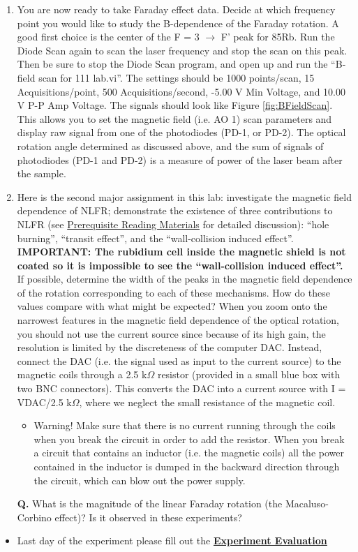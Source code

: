 \documentclass{../lab}
\begin{document}
\begin{enumerate}
\newpage
    
    \item You are now ready to take Faraday effect data. Decide at which frequency point you would like to study the B-dependence of the Faraday rotation. A good first choice is the center of the F = 3 $\rightarrow$ F' peak for 85Rb. Run the Diode Scan again to scan the laser frequency and stop the scan on this peak. Then be sure to stop the Diode Scan program, and open up and run the ``B-field scan for 111 lab.vi''. The settings should be 1000 points/scan, 15 Acquisitions/point, 500 Acquisitions/second, -5.00 V Min Voltage, and 10.00 V P-P Amp Voltage. The signals should look like Figure \ref{fig:BFieldScan}. This allows you to set the magnetic field (i.e. AO 1) scan parameters and display raw signal from one of the photodiodes (PD-1, or PD-2). The optical rotation angle determined as discussed above, and the sum of signals of photodiodes (PD-1 and PD-2) is a measure of power of the laser beam after the sample.
    
    \item Here is the second major assignment in this lab: investigate the magnetic field dependence of NLFR; demonstrate the existence of three contributions to NLFR (see \hyperref[sec:BeforeFirstDay]{Prerequisite Reading Materials} for detailed discussion): ``hole burning'', ``transit effect'', and the ``wall-collision induced effect''. \textbf{IMPORTANT: The rubidium cell inside the magnetic shield is not coated so it is impossible to see the ``wall-collision induced effect''.} If possible, determine the width of the peaks in the magnetic field dependence of the rotation corresponding to each of these mechanisms. How do these values compare with what might be expected? When you zoom onto the narrowest features in the magnetic field dependence of the optical rotation, you should not use the current source since because of its high gain, the resolution is limited by the discreteness of the computer DAC. Instead, connect the DAC (i.e. the signal used as input to the current source) to the magnetic coils through a 2.5 k$\Omega$ resistor (provided in a small blue box with two BNC connectors). This converts the DAC into a current source with I = VDAC/2.5 k$\Omega$, where we neglect the small resistance of the magnetic coil.
    
    \begin{itemize}
        \item Warning! Make sure that there is no current running through the coils when you break the circuit in order to add the resistor. When you break a circuit that contains an inductor (i.e. the magnetic coils) all the power contained in the inductor is dumped in the backward direction through the circuit, which can blow out the power supply.
    
    \end{itemize}
    
    \textbf{Q.} What is the magnitude of the linear Faraday rotation (the Macaluso-Corbino effect)? Is it observed in these experiments?

\end{enumerate}

\begin{itemize}
    \item Last day of the experiment please fill out the \href{\ExperimentEvaluation}{\textbf{Experiment Evaluation}}

\end{itemize}
\end{document}
